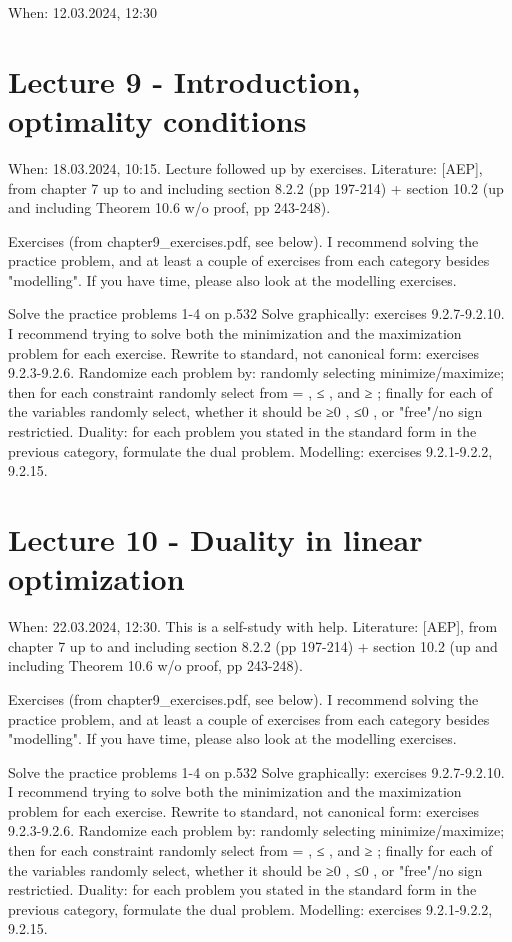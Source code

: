 \documentclass[11pt,oneside,a4paper,openright]{article}
\begin{document}
When: 12.03.2024, 12:30

\section*{Lecture 9 - Introduction, optimality conditions}

When: 18.03.2024, 10:15. Lecture followed up by exercises.
Literature: [AEP], from chapter 7 up to and including section 8.2.2 (pp 197-214) + section 10.2 (up and including Theorem 10.6 w/o proof, pp 243-248).

Exercises (from chapter9_exercises.pdf, see below). I recommend solving the practice problem, and at least a couple of exercises from each category besides "modelling". If you have time, please also look at the modelling exercises.

Solve the practice problems 1-4 on p.532
Solve graphically: exercises 9.2.7-9.2.10. I recommend trying to solve both the minimization and the maximization problem for each exercise.
Rewrite to standard, not canonical form: exercises 9.2.3-9.2.6. Randomize each problem by: randomly selecting minimize/maximize; then for each constraint randomly select from =
, ≤
, and ≥
; finally for each of the variables randomly select, whether it should be ≥0
, ≤0
, or "free"/no sign restrictied.
Duality: for each problem you stated in the standard form in the previous category, formulate the dual problem.
Modelling: exercises 9.2.1-9.2.2, 9.2.15.

\section*{Lecture 10 - Duality in linear optimization}

When: 22.03.2024, 12:30. This is a self-study with help.
Literature: [AEP], from chapter 7 up to and including section 8.2.2 (pp 197-214) + section 10.2 (up and including Theorem 10.6 w/o proof, pp 243-248).

Exercises (from chapter9_exercises.pdf, see below). I recommend solving the practice problem, and at least a couple of exercises from each category besides "modelling". If you have time, please also look at the modelling exercises.

Solve the practice problems 1-4 on p.532
Solve graphically: exercises 9.2.7-9.2.10. I recommend trying to solve both the minimization and the maximization problem for each exercise.
Rewrite to standard, not canonical form: exercises 9.2.3-9.2.6. Randomize each problem by: randomly selecting minimize/maximize; then for each constraint randomly select from =
, ≤
, and ≥
; finally for each of the variables randomly select, whether it should be ≥0
, ≤0
, or "free"/no sign restrictied.
Duality: for each problem you stated in the standard form in the previous category, formulate the dual problem.
Modelling: exercises 9.2.1-9.2.2, 9.2.15.
\end{document}
